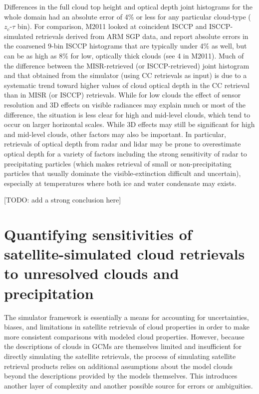 Differences in the full cloud top height and optical depth joint
histograms for the whole domain had an absolute error of 4\% or less for
any particular cloud-type (\(z_c\)-\(\tau\) bin). For comparison, M2011
looked at coincident ISCCP and ISCCP-simulated retrievals derived from
ARM SGP data, and report absolute errors in the coarsened 9-bin ISCCP
histograms that are typically under 4\% as well, but can be as high as
8\% for low, optically thick clouds (see 4 in M2011). Much of the
difference between the MISR-retrieved (or ISCCP-retrieved) joint
histogram and that obtained from the simulator (using CC retrievals as
input) is due to a systematic trend toward higher values of cloud
optical depth in the CC retrieval than in MISR (or ISCCP) retrievals.
While for low clouds the effect of sensor resolution and 3D effects on
visible radiances may explain much or most of the difference, the
situation is less clear for high and mid-level clouds, which tend to
occur on larger horizontal scales. While 3D effects may still be
significant for high and mid-level clouds, other factors may also be
important. In particular, retrievals of optical depth from radar and
lidar may be prone to overestimate optical depth for a variety of
factors including the strong sensitivity of radar to precipitating
particles (which makes retrieval of small or non-precipitating particles
that usually dominate the visible-extinction difficult and uncertain),
especially at temperatures where both ice and water condensate may
exists.

{[}TODO: add a strong conclusion here{]}

\chapter{Quantifying sensitivities of satellite-simulated cloud
retrievals to unresolved clouds and precipitation}\label{sec:subgrid1}

The simulator framework is essentially a means for accounting for
uncertainties, biases, and limitations in satellite retrievals of cloud
properties in order to make more consistent comparisons with modeled
cloud properties. However, because the descriptions of clouds in GCMs
are themselves limited and insufficient for directly simulating the
satellite retrievals, the process of simulating satellite retrieval
products relies on additional assumptions about the model clouds beyond
the descriptions provided by the models themselves. This introduces
another layer of complexity and another possible source for errors or
ambiguities.

